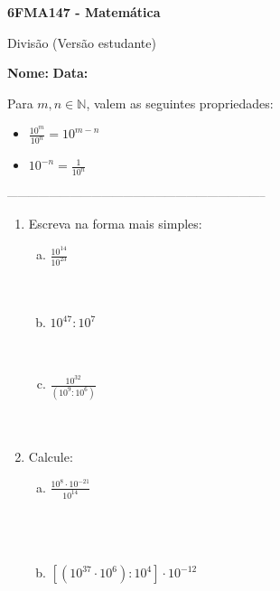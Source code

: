 \documentclass[a4paper,14pt]{article}
\begin{document}
	
	\noindent\textbf{6FMA147 - Matemática} 
	
	\begin{center}Divisão (Versão estudante)
	\end{center}
	
	\noindent\textbf{Nome:} \underline{\hspace{10cm}}
	\noindent\textbf{Data:} \underline{\hspace{4cm}}
	
	
	\begin{multicols}{2}
	    \noindent Para $m, n \in \mathbb{N}$, valem as seguintes propriedades: \\
	    \begin{itemize}
	    	\item $\frac{10^m}{10^n} = 10^{m - n}$
	    	\item $10^{-n} = \frac{1}{10^n}$
	    \end{itemize}
		\noindent\textsubscript{--------------------------------------------------------------------------}
		\begin{enumerate} 
			\item Escreva na forma mais simples:
			\begin{enumerate}[a)]
				\item $\frac{10^{14}}{10^{23}}$ \\\\\\
				\item $10^{47} : 10^7$ \\\\\\
				\item $\frac{10^{32}}{(10^9 : 10^6)}$ \\\\\\
			\end{enumerate}
			\item Calcule:
			\begin{enumerate}[a)]
				\item $\frac{10^8 \cdot 10^{-21}}{10^{14}}$ \\\\\\\\
				\item $[(10^{37} \cdot 10^6) : 10^4] \cdot 10^{-12}$ \\\\

\end{enumerate}
\end{enumerate}
\end{multicols}
\end{document}
